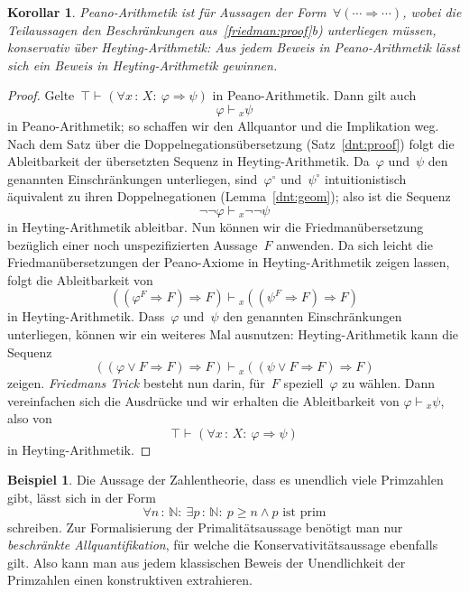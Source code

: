 \documentclass[a4paper,ngerman,12pt]{scrartcl}
\theoremstyle{definition}
\newtheorem{bsp}[defn]{Beispiel}
\theoremstyle{plain}
\newtheorem{kor}[defn]{Korollar}
\theoremstyle{remark}
\newcommand{\NN}{\mathbb{N}}
\newcommand{\seq}[1]{\mathrel{\vdash\!\!\!_{#1}}}
\renewcommand{\_}{\mathpunct{.}\,}
\newcommand{\?}{\,{:}\,}
\begin{document}
\begin{kor}Peano-Arithmetik ist für Aussagen der Form~$\forall (\cdots
\Rightarrow \cdots)$, wobei die Teilaussagen den Beschränkungen
aus~\ref{friedman:proof}b) unterliegen müssen, konservativ über
Heyting-Arithmetik: Aus jedem Beweis in Peano-Arithmetik lässt sich ein Beweis
in Heyting-Arithmetik gewinnen.\end{kor}
\begin{proof}Gelte~$\top \seq{} (\forall x\?X{:}\ \varphi \Rightarrow \psi)$ in
Peano-Arithmetik. Dann gilt auch
\[ \varphi \seq{x} \psi \]
in Peano-Arithmetik; so schaffen wir den Allquantor und die Implikation weg.
Nach dem Satz über die Doppelnegationsübersetzung (Satz~\ref{dnt:proof}) folgt
die Ableitbarkeit der übersetzten Sequenz in Heyting-Arithmetik. Da~$\varphi$
und~$\psi$ den genannten Einschränkungen unterliegen, sind~$\varphi^\circ$
und~$\psi^\circ$ intuitionistisch äquivalent zu ihren Doppelnegationen
(Lemma~\ref{dnt:geom}); also ist die Sequenz
\[ \neg\neg\varphi \seq{x} \neg\neg\psi \]
in Heyting-Arithmetik ableitbar. Nun können wir die Friedmanübersetzung
bezüglich einer noch unspezifizierten Aussage~$F$ anwenden. Da sich leicht die
Friedmanübersetzungen der Peano-Axiome in Heyting-Arithmetik zeigen lassen,
folgt die Ableitbarkeit von
\[ ((\varphi^F \Rightarrow F) \Rightarrow F) \seq{x}
  ((\psi^F \Rightarrow F) \Rightarrow F) \]
in Heyting-Arithmetik. Dass~$\varphi$ und~$\psi$ den genannten Einschränkungen
unterliegen, können wir ein weiteres Mal ausnutzen: Heyting-Arithmetik kann die
Sequenz
\[ ((\varphi \vee F \Rightarrow F) \Rightarrow F) \seq{x}
  ((\psi \vee F \Rightarrow F) \Rightarrow F) \]
zeigen. \emph{Friedmans Trick} besteht nun darin, für~$F$ speziell~$\varphi$ zu
wählen. Dann vereinfachen sich die Ausdrücke und wir erhalten die Ableitbarkeit
von $\varphi \seq{x} \psi$, also von
\[ \top \seq{} (\forall x\?X{:}\ \varphi \Rightarrow \psi) \]
in Heyting-Arithmetik.
\end{proof}

\begin{bsp}Die Aussage der Zahlentheorie, dass es unendlich viele Primzahlen
gibt, lässt sich in der Form
\[ \forall n\?\NN{:}\ \exists p\?\NN{:}\ p \geq n \wedge \text{$p$ ist prim} \]
schreiben. Zur Formalisierung der Primalitätsaussage benötigt man nur
\emph{beschränkte Allquantifikation}, für welche die Konservativitätsaussage
ebenfalls gilt. Also kann man aus jedem klassischen Beweis der Unendlichkeit
der Primzahlen einen konstruktiven extrahieren.
\end{bsp}
\end{document}
